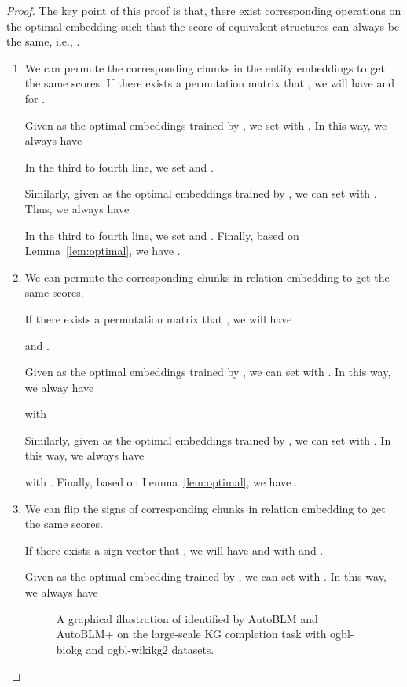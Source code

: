 \documentclass[10pt,journal,compsoc]{IEEEtran}
\begin{document}
\begin{proof}
The key point of this proof is that,
there exist corresponding operations on the optimal embedding such that the score of equivalent structures
can always be the same,
i.e.,
.
\begin{enumerate}[label=(\roman*),leftmargin=15px]
\item 
We can permute the corresponding chunks in the entity embeddings 
to get the same scores.
If there exists a permutation matrix  that ,
we will have  and 
for . 


Given  as the optimal embeddings trained by ,
we set 
with .
In this way,
we always have 

In the third to fourth line, we set  and .

Similarly,
given  as the optimal embeddings trained by ,
we can set 
with  .
Thus, we always have

In the third to fourth line, we set  and .
Finally,
based on Lemma~\ref{lem:optimal},
we have .

	
\item 
We can permute the corresponding chunks in relation embedding
to get the same scores.

If there exists a permutation matrix  that 
,
we will have 

and 
.

Given 
as the optimal embeddings trained by ,
we can set  with
.
In this way,
we alway have 	

with 


Similarly,
given  as the optimal embeddings trained by ,
we can set 
with  .
In this way,
we always have

with .
Finally,
based on Lemma~\ref{lem:optimal},
we have .

\item 
We can flip the signs of corresponding chunks in relation embedding
to get the same scores.

If there exists a sign vector 
that
,
we will have
 and  with 
and .

Given 
as the optimal embedding trained by 
,
we can set  with
.
In this way,
we always have

\begin{figure*}[ht]
	\centering
	\qquad
	\qquad\qquad
	\qquad
	\vspace{-10px}
	\caption{A graphical illustration of  identified by AutoBLM and AutoBLM+ 
		on the large-scale KG completion task with ogbl-biokg and ogbl-wikikg2 datasets.}
	\label{fig:structure:ogb}
\end{figure*}



\end{enumerate}
\end{proof}
\end{document}
